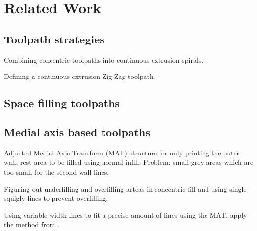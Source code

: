 \section{Related Work}

\subsection{Toolpath strategies}


Combining concentric toolpaths into continuous extrusion spirals. \cite{Held2009}

Defining a continuous extrusion Zig-Zag toolpath. \cite{Jin2017}

\subsection{Space filling toolpaths}


\subsection{Medial axis based toolpaths}
Adjusted Medial Axis Transform (MAT) structure for only printing the outer wall, rest area to be filled using normal infill. \cite{Moesen2011}
Problem: small grey areas which are too small for the second wall lines.

Figuring out underfilling and overfilling arteas in concentric fill and using single squigly lines to prevent overfilling. \cite{Jin2017}

Using variable width lines to fit a precise amount of lines using the MAT.
\cite{Ding2016a} apply the method from \cite{kao1998optimal}.

